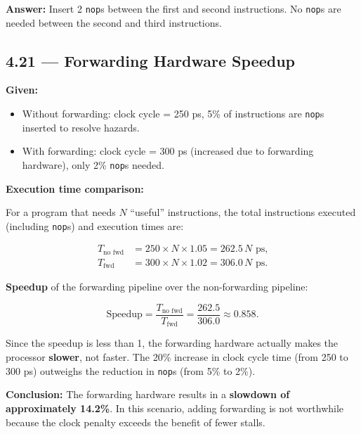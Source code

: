 \noindent\textbf{Answer:} Insert 2 \texttt{nop}s between the first and second
instructions. No \texttt{nop}s are needed between the second and third
instructions.

\subsection*{4.21 --- Forwarding Hardware Speedup}
\hypertarget{sol-4.21}{}

\noindent\textbf{Given:}
\begin{itemize}
  \item Without forwarding: clock cycle = 250 ps, 5\% of instructions are
        \texttt{nop}s inserted to resolve hazards.
  \item With forwarding: clock cycle = 300 ps (increased due to forwarding
        hardware), only 2\% \texttt{nop}s needed.
\end{itemize}

\medskip\noindent\textbf{Execution time comparison:}

For a program that needs $N$ ``useful'' instructions, the total instructions
executed (including \texttt{nop}s) and execution times are:

\begin{align*}
  T_{\text{no fwd}} &= 250 \times N \times 1.05 = 262.5\,N \text{ ps,} \\
  T_{\text{fwd}}    &= 300 \times N \times 1.02 = 306.0\,N \text{ ps.}
\end{align*}

\noindent\textbf{Speedup} of the forwarding pipeline over the non-forwarding
pipeline:

\[
  \text{Speedup} = \frac{T_{\text{no fwd}}}{T_{\text{fwd}}}
    = \frac{262.5}{306.0}
    \approx 0.858.
\]

Since the speedup is less than 1, the forwarding hardware actually makes the
processor \textbf{slower}, not faster. The 20\% increase in clock cycle time
(from 250 to 300 ps) outweighs the reduction in \texttt{nop}s (from 5\% to
2\%).

\medskip\noindent\textbf{Conclusion:} The forwarding hardware results in a
\textbf{slowdown of approximately 14.2\%}. In this scenario, adding forwarding
is not worthwhile because the clock penalty exceeds the benefit of fewer stalls.
